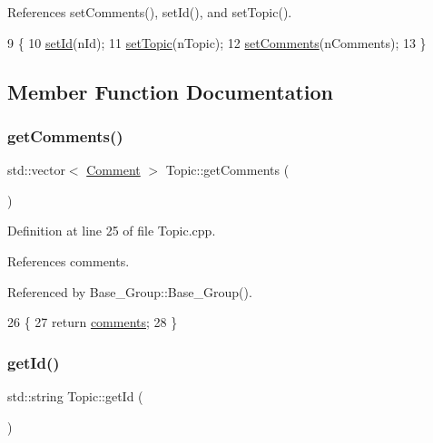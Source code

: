 References set\+Comments(), set\+Id(), and set\+Topic().


\begin{DoxyCode}
9 \{
10     \hyperlink{class_topic_a11ecfa79333a902a33398ac628280cfa}{setId}(nId);
11     \hyperlink{class_topic_a64ecaea143938ef771830f05b703853f}{setTopic}(nTopic);
12     \hyperlink{class_topic_ada5f53077553db0022f528b0328a7437}{setComments}(nComments);
13 \}
\end{DoxyCode}


\subsection{Member Function Documentation}
\mbox{\label{class_topic_ac800190b0f4f8ee514255cc75bce1f13}} 
\subsubsection{\texorpdfstring{get\+Comments()}{getComments()}}
{\footnotesize\ttfamily std\+::vector$<$ \hyperlink{class_comment}{Comment} $>$ Topic\+::get\+Comments (\begin{DoxyParamCaption}{ }\end{DoxyParamCaption})}



Definition at line 25 of file Topic.\+cpp.



References comments.



Referenced by Base\+\_\+\+Group\+::\+Base\+\_\+\+Group().


\begin{DoxyCode}
26 \{
27     \textcolor{keywordflow}{return} \hyperlink{class_topic_a7302f2cd0169b84d3e4e58af7bc1f73d}{comments};
28 \}
\end{DoxyCode}
\mbox{\label{class_topic_a0306b941698e573841540d44de1a908a}} 
\subsubsection{\texorpdfstring{get\+Id()}{getId()}}
{\footnotesize\ttfamily std\+::string Topic\+::get\+Id (\begin{DoxyParamCaption}{ }\end{DoxyParamCaption})}



